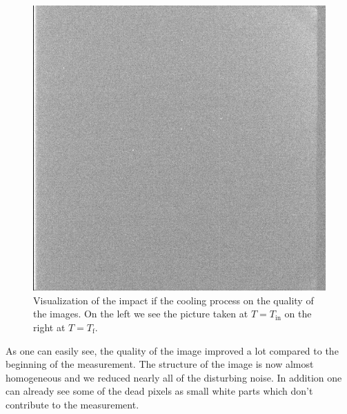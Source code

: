 \begin{figure}[H]
\begin{minipage}{0.4\textwidth}
		\includegraphics[scale=0.17]{figures/Exposures/cooling_end}
	\end{minipage}
	\caption{Visualization of the impact if the cooling process on the quality of the images. On the left we see the picture taken at $T = T_{\text{in}}$ on the right at $T = T_{\text{f}}$.}
\end{figure} 
As one can easily see, the quality of the image improved a lot compared to the beginning of the measurement. The structure of the image is now almost homogeneous and we reduced nearly all of the disturbing noise. In addition one can already see some of the dead pixels as small white parts which don't contribute to the measurement. \\
 

